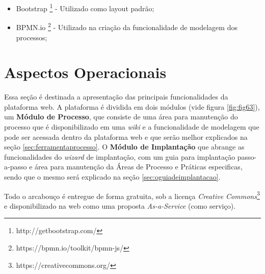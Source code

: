 \begin{itemize}
    \item Bootstrap \footnote{http://getbootstrap.com/} - Utilizado como layout padrão;
    \item BPMN.io \footnote{https://bpmn.io/toolkit/bpmn-js/} - Utilizado na criação da funcionalidade de modelagem dos processos;
\end{itemize}

\section{Aspectos Operacionais}
\label{sec:aspectosoperacionais}

Essa seção é destinada a apresentação das principais funcionalidades da plataforma web. A plataforma é dividida em dois módulos (vide figura \ref{fig:fig63}), um \textbf{Módulo de Processo}, que consiste de uma área para manutenção do processo que é disponibilizado em uma \textit{wiki} e a funcionalidade de modelagem que pode ser acessada dentro da plataforma web e que serão melhor explicados na seção \ref{sec:ferramentaprocesso}. O \textbf{Módulo de Implantação} que abrange as funcionalidades do \textit{wizard} de implantação, com um guia para implantação passo-a-passo e área para manutenção da Áreas de Processo e Práticas especificas, sendo que o mesmo será explicado na seção \ref{sec:oguiadeimplantacao}.

Todo o arcabouço é entregue de forma gratuita, sob a licença \textit{Creative Commons}\footnote{https://creativecommons.org/} e disponibilizado na web como uma proposta \textit{As-a-Service} (como serviço). 




